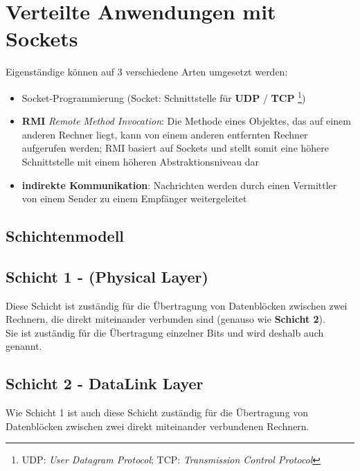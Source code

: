 \section{Verteilte Anwendungen mit Sockets}\label{sec:rmiapps}

Eigenständige  können auf 3 verschiedene Arten umgesetzt werden:

\begin{itemize}
    \item Socket-Programmierung (Socket: Schnittstelle für \textbf{UDP} / \textbf{TCP} \footnote{
    UDP: \textit{User Datagram Protocol}; TCP: \textit{Transmission Control Protocol}
    })
    \item \textbf{RMI} \textit{Remote Method Invocation}: Die Methode eines Objektes, das auf einem anderen Rechner liegt, kann von einem anderen entfernten Rechner aufgerufen werden; RMI basiert auf Sockets und stellt somit eine höhere Schnittstelle mit einem höheren Abstraktionsniveau dar
    \item \textbf{indirekte Kommunikation}: Nachrichten werden durch einen Vermittler von einem Sender zu einem Empfänger weitergeleitet
\end{itemize}


\subsection{Schichtenmodell}

\subsection*{Schicht 1 - (Physical Layer)}

Diese Schicht ist zuständig für die Übertragung von Datenblöcken zwischen zwei Rechnern, die direkt miteinander verbunden sind (genauso wie \textbf{Schicht 2}).\\
Sie ist zuständig für die Übertragung einzelner Bits und wird deshalb auch  genannt.

\subsection*{Schicht 2 - DataLink Layer}

\noindent
Wie Schicht 1 ist auch diese Schicht zuständig für die Übertragung von Datenblöcken zwischen zwei direkt miteinander verbundenen Rechnern.\\

